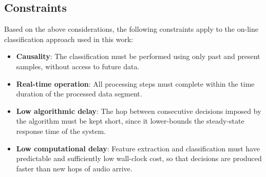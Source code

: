 \subsection{Constraints}
\label{subsec:constraints}
Based on the above considerations, the following constraints apply to the on-line classification approach used in this work:
\begin{itemize}
    \item \textbf{Causality}: The classification must be performed using only past and present samples, without access to future data.
    \item \textbf{Real-time operation}: All processing steps must complete within the time duration of the processed data segment.
    \item \textbf{Low algorithmic delay}: The hop between consecutive decisions imposed by the algorithm must be kept short, since it lower-bounds the steady-state response time of the system.
    \item \textbf{Low computational delay}: Feature extraction and classification must have predictable and sufficiently low wall-clock cost, so that decisions are produced faster than new hops of audio arrive.
\end{itemize}


